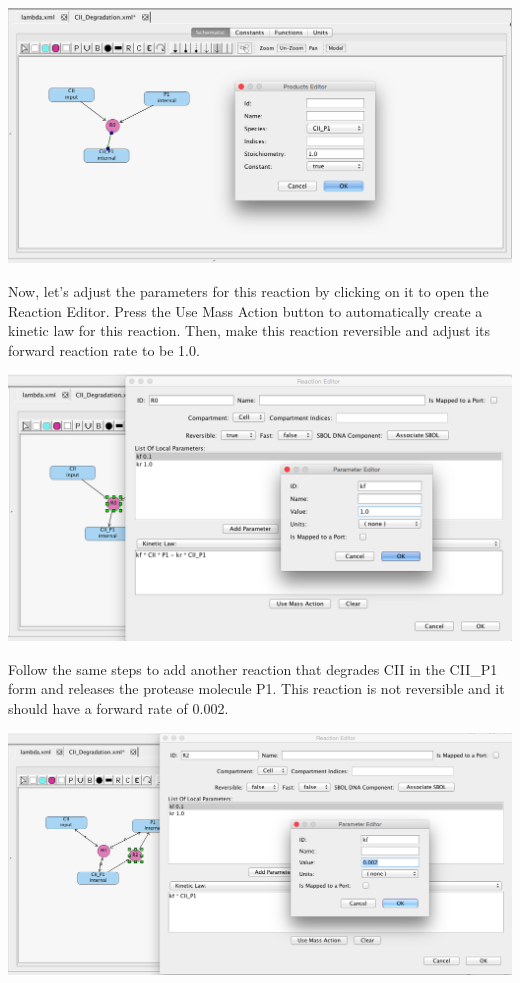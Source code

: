\documentclass[titlepage,11pt]{article}
\begin{document}
\begin{center}
\includegraphics[width=160mm]{screenshots/product}
\end{center}

Now, let's adjust the parameters for this reaction by clicking on it to open the Reaction Editor. Press the Use Mass Action button to automatically create a kinetic law for this reaction.  Then, make this reaction reversible and adjust its forward reaction rate to be 1.0.  

\begin{center}
\includegraphics[width=160mm]{screenshots/localParam}
\end{center}

Follow the same steps to add another reaction that degrades CII in the CII\_P1 form and releases the protease molecule P1.  This reaction is not reversible and it should have a forward rate of 0.002.

\begin{center}
\includegraphics[width=160mm]{screenshots/kineticLaw}
\end{center}
\end{document}
